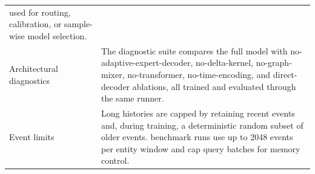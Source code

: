 \documentclass[preprint,12pt]{elsarticle}
\begin{document}
\begin{table}[!htbp]
\begin{tabular}{p{}p{}}
used for routing, calibration, or sample-wise model selection. \\
\addlinespace
Architectural diagnostics & The diagnostic suite compares the full \method{}
model with no-adaptive-expert-decoder, no-delta-kernel, no-graph-mixer,
no-transformer, no-time-encoding, and direct-decoder ablations, all trained and
evaluated through the same runner. \\
\addlinespace
Event limits & Long histories are capped by retaining recent events and, during
training, a deterministic random subset of older events. \method{} benchmark runs use
up to 2048 events per entity window and cap query batches for memory control. \\
\bottomrule
\end{tabular}
\end{table}
\end{document}
